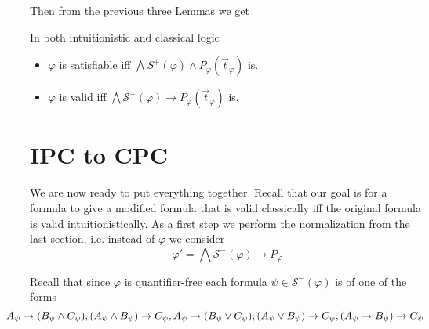 \documentclass[a4paper,UKenglish,cleveref, autoref, thm-restate]{lipics-v2021}
\begin{document}
Then from the previous three Lemmas we get

\begin{corollary}\label{equivalid}
	In both intuitionistic and classical logic
	\begin{itemize}
		\item $\varphi$ is satisfiable iff $\mathcal \bigwedge S^+(\varphi)\wedge P_\varphi(\vec t_\varphi)$ is.
		\item $\varphi$ is valid iff $\bigwedge\mathcal S^-(\varphi)\to P_\varphi(\vec t_\varphi)$ is.
	\end{itemize}
\end{corollary}

\section{IPC to CPC}

We are now ready to put everything together. Recall that our goal is for a formula to give a modified formula that is valid classically iff the original formula is valid intuitionistically. As a first step we perform the normalization from the last section, i.e. instead of $\varphi$ we consider $$\varphi' = \bigwedge \mathcal S^-(\varphi)\to P_\varphi$$

Recall that since $\varphi$ is quantifier-free each formula $\psi\in\mathcal S^-(\varphi)$ is of one of the forms
$$\hspace{-0.8cm}A_\psi\to (B_\psi\wedge C_\psi), (A_\psi\wedge B_\psi)\to C_\psi, A_\psi\to (B_\psi\vee C_\psi), (A_\psi\vee B_\psi)\to C_\psi, (A_\psi\to B_\psi)\to C_\psi$$
\end{document}
